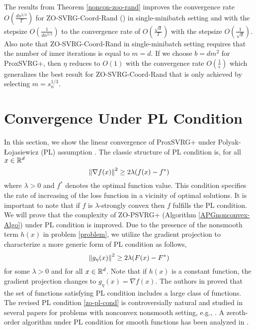 \begin{remark}
The results from Theorem \ref{noncon-zoo-rand} improves the convergence rate $O(\frac{d{n}^{2/3}}{T})$ for ZO-SVRG-Coord-Rand (\cite{ji2019improved}) in single-minibatch setting  and   with the stepsize $O(\frac{1}{dn^{2/3}})$ to the convergence rate of $O(\frac{\sqrt{d}}{T})$
with the stepsize $O(\frac{1}{\sqrt{d}})$. Also note that ZO-SVRG-Coord-Rand in single-minibatch setting requires that the number of inner iterations is equal to $m = d$. If we
choose $b = d m^2$ for ProxSVRG+, then $\eta$ reduces to $O(1)$ with the convergence rate $O(\frac{1}{\epsilon})$ which generalizes the best result for ZO-SVRG-Coord-Rand that is only achieved by selecting $m = s_n^{1/3}$.
\end{remark}
\section{Convergence Under PL Condition}
In this section, we show the linear convergence of  ProxSVRG+ under Polyak-Łojasiewicz (PL) assumption \cite{polyak1963gradient}.
The classic structure of PL condition is, for all $x\in\mathbb{R}^d$
\begin{equation}
\left\lVert\nabla f(x)\right\rVert^2 \geq 2\lambda (f(x) - f^*)
\end{equation}
where $\lambda >0$ and $f^*$ denotes the optimal function value. This condition specifies the rate of increasing of the loss function in a vicinity of optimal solutions. It is important to note that if $f$ is $\lambda$-strongly convex then $f$ fulfills the PL condition. We will prove that the complexity of ZO-PSVRG+ (Algorithm \ref{APGnonconvex-Algo}) under PL condition is improved.
Due to the presence of the nonsmooth term $h(x)$ in problem \eqref{problem}, we utilize the gradient projection to characterize a more generic form of PL condition as follows, 
\begin{equation}\label{zo-pl-cond}
\left\lVert g_{\eta}(x)\right\rVert^2 \geq 2\lambda (F(x) - F^*)
\end{equation}
for some $\lambda >0$ and for all $x\in\mathbb{R}^d$. Note that if $h(x)$ is a constant function, the gradient projection changes to $g_{\eta}(x) = \nabla f(x)$.
The authors in \cite{karimi2016linear} proved that the set of functions satisfying PL condition includes a large class of functions. The revised PL condition \eqref{zo-pl-cond} is controversially natural and studied in several papers for problems with nonconvex nonsmooth setting, e.g., \cite{li2018simple}. A zeroth-order algorithm under PL condition for smooth functions has been analyzed in \cite{ji2019improved}.
